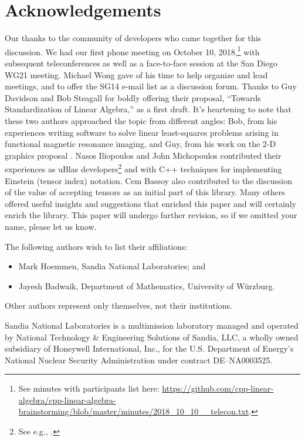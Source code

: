 \section{Acknowledgements}
\label{S:ack}

Our thanks to the community of developers who came together for this
discussion.  We had our first phone meeting on October 10,
2018,\footnote{See minutes with participants list here:
  \url{https://github.com/cpp-linear-algebra/cpp-linear-algebra-brainstorming/blob/master/minutes/2018_10_10__telecon.txt}.}
with subsequent teleconferences as well as a face-to-face session at
the San Diego WG21 meeting.  Michael Wong gave of his time to help
organize and lead meetings, and to offer the SG14 e-mail list as a
discussion forum.  Thanks to Guy Davidson and Bob Steagall for boldly
offering their proposal, ``Towards Standardization of Linear
Algebra,'' as a first draft.  It's heartening to note that these two
authors approached the topic from different angles: Bob, from his
experiences writing software to solve linear least-squares problems
arising in functional magnetic resonance imaging, and Guy, from his
work on the 2-D graphics proposal \cite{P0267r8}.  Nasos Iliopoulos
and John Michopoulos contributed their experiences as uBlas
developers\footnote{See e.g., \cite{iliopoulos2011ublascl}.}  and with
C++ techniques for implementing Einstein (tensor index) notation.  Cem
Bassoy also contributed to the discussion of the value of accepting
tensors as an initial part of this library.  Many others offered
useful insights and suggestions that enriched this paper and will
certainly enrich the library.  This paper will undergo further
revision, so if we omitted your name, please let us know.

The following authors wish to list their affiliations:
\begin{itemize}
\item Mark Hoemmen, Sandia National Laboratories; and
\item Jayesh Badwaik, Department of Mathematics, University of W\"urzburg.
\end{itemize}
Other authors represent only themselves, not their institutions.

Sandia National Laboratories is a multimission laboratory managed and
operated by National Technology \& Engineering Solutions of Sandia,
LLC, a wholly owned subsidiary of Honeywell International, Inc., for
the U.S. Department of Energy's National Nuclear Security
Administration under contract DE--NA0003525.


